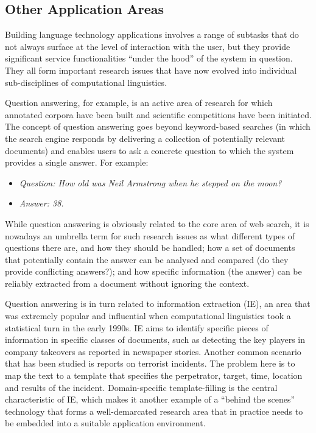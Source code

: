 \begin{multicols}{2}
\subsection{Other Application Areas}

Building language technology applications involves a range of subtasks that do not always surface at the level of interaction with the user, but they provide significant service functionalities ``under the hood'' of the system in question.  They all form important research issues that have now evolved into individual sub-disciplines of computational linguistics.


Question answering, for example, is an active area of research for which annotated corpora have been built and scientific competitions have been initiated. The concept of question answering goes beyond keyword-based searches (in which the search engine responds by delivering a collection of potentially relevant documents) and enables users to ask a concrete question to which the system provides a single answer. For example:

\begin{itemize}
\item[] \textit{Question: How old was Neil Armstrong when he stepped on the
              moon?}

\item[] \textit{Answer: 38.}
\end{itemize}

While question answering is obviously related to the core area of web search, it is nowadays an umbrella term for such research issues as what different types of questions there are, and how they should be handled; how a set of documents that potentially contain the answer can be analysed and compared (do they provide conflicting answers?); and how specific information (the answer) can be reliably extracted from a document without ignoring the context.

Question answering is in turn related to information extraction (IE), an area that was extremely popular and influential when computational linguistics took a statistical turn in the early 1990s. IE aims to identify specific pieces of information in specific classes of documents, such as detecting the key players in company takeovers as reported in newspaper stories. Another common scenario that has been studied is reports on terrorist incidents. The problem here is to map the text to a template that specifies the perpetrator, target, time, location and results of the incident. Domain-specific template-filling is the central characteristic of IE, which makes it another example of a ``behind the scenes'' technology that forms a well-demarcated research area that in practice needs to be embedded into a suitable application environment.


\end{multicols}
